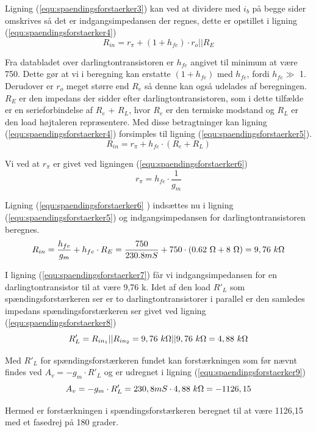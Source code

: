 Ligning (\ref{equ:spaendingsforstaerker3}) kan ved at dividere med $i_b$ på begge sider omskrives så det er indgangsimpedansen der regnes, dette er opstillet i ligning (\ref{equ:spaendingsforstaerker4})
\begin{equation}
\label{equ:spaendingsforstaerker4}
R_{in} = r_{\pi} + (1+h_{fe}) \cdot r_o||R_E 
\end{equation}

Fra databladet over darlingtontransistoren er $h_{fe}$ angivet til minimum at være 750. Dette gør at vi i beregning kan erstatte $(1+h_{fe})$ med $h_{fe}$, fordi $h_{fe} \gg$ 1. Derudover er $r_o$ meget større end $R_e$ så denne kan også udelades af beregningen. $R_E$ er den impedans der sidder efter darlingtontransistoren, som i dette tilfælde er en serieforbindelse af $R_e$ + $R_L$, hvor $R_e$ er den termiske modstand og $R_L$ er den load højtaleren repræsentere. Med disse betragtninger kan ligning (\ref{equ:spaendingsforstaerker4}) forsimples til ligning (\ref{equ:spaendingsforstaerker5}).
\begin{equation}
\label{equ:spaendingsforstaerker5}
R_{in} = r_{\pi} + h_{fe} \cdot (R_e + R_L)
\end{equation}

Vi ved at $r_{\pi}$ er givet ved ligningen (\ref{equ:spaendingsforstaerker6})
\begin{equation}
\label{equ:spaendingsforstaerker6}
r_{\pi} = h_{fe} \cdot \frac{1}{g_m}
\end{equation}

Ligning (\ref{equ:spaendingsforstaerker6} ) indsættes nu i ligning (\ref{equ:spaendingsforstaerker5}) og indgangsimpedansen for darlingtontransistoren beregnes.
\begin{equation}
\label{equ:spaendingsforstaerker7}
R_{in} = \frac{h_{fe}}{g_m} + h_{fe} \cdot R_E = \frac{750}{230.8 mS} + 750 \cdot (0.62~\ohm + 8~\ohm) = 9,76~k\ohm  
\end{equation}

I ligning (\ref{equ:spaendingsforstaerker7}) får vi indgangsimpedansen for en darlingtontransistor til at være 9,76 k\ohm. Idet af den load $R'_L$ som spændingsforstærkeren ser er to darlingtontransistorer i parallel er den samledes impedans spændingsforstærkeren ser givet ved ligning (\ref{equ:spaendingsforstaerker8})
\begin{equation}
\label{equ:spaendingsforstaerker8}
R'_L = R_{in_1}||R_{in_2} = 9,76~k\ohm||9,76~k\ohm = 4,88~k\ohm
\end{equation}  

Med $R'_L$ for spændingsforstærkeren fundet kan forstærkningen som før nævnt findes ved $A_v = -g_m \cdot R'_L$ og er udregnet i ligning (\ref{equ:spaendingsforstaerker9})
\begin{equation}
\label{equ:spaendingsforstaerker9}
A_v = -g_m \cdot R'_L = 230,8 mS \cdot 4,88~k\ohm = -1126,15
\end{equation}

Hermed er forstærkningen i spændingsforstærkeren beregnet til at være 1126,15 med et fasedrej på 180 grader.